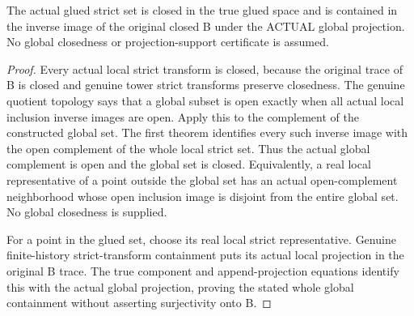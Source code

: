 \begin{theorem}
\label{hir:sharp-actual-glued-strict-set-closed-over-original}
\leanok
The actual glued strict set is closed in the true glued space and is
contained in the inverse image of the original closed B under the ACTUAL
global projection. No global closedness or projection-support certificate
is assumed.
\end{theorem}
\begin{proof}
Every actual local strict transform is closed, because the original trace
of B is closed and genuine tower strict transforms preserve closedness.
The genuine quotient topology says that a global subset is open exactly
when all actual local inclusion inverse images are open. Apply this to the
complement of the constructed global set. The first theorem identifies
every such inverse image with the open complement of the whole local strict
set. Thus the actual global complement is open and the global set is closed.
Equivalently, a real local representative of a point outside the global set
has an actual open-complement neighborhood whose open inclusion image is
disjoint from the entire global set. No global closedness is supplied.

For a point in the glued set, choose its real local strict representative.
Genuine finite-history strict-transform containment puts its actual local
projection in the original B trace. The true component and append-projection
equations identify this with the actual global projection, proving the stated
whole global containment without asserting surjectivity onto B.
\end{proof}


